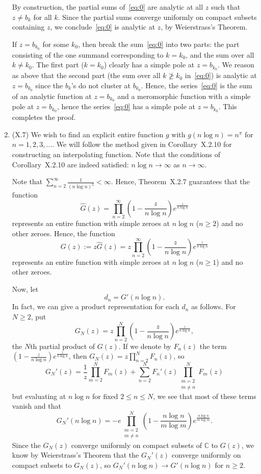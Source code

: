 \documentclass[11pt]{book}
\theoremstyle{definition}
\begin{document}
\begin{enumerate}
    By construction, the partial sums of~\eqref{eq:0} are analytic at all $z$ such that $z\neq b_k$ for all $k$. Since the partial sums converge uniformly on compact subsets containing $z$, we conclude~\eqref{eq:0} is analytic at $z$, by Weierstrass's Theorem. 
    
    If $z=b_{k_0}$ for some $k_0$, then break the sum~\eqref{eq:0} into two parts: the part consisting of the one summand corresponding to $k=k_0$, and the sum over all $k\neq k_0$.  The first part ($k=k_0$) clearly has a simple pole at $z=b_{k_0}$.  We reason as above that the second part (the sum over all $k\ngeq k_0$ in~\eqref{eq:0}) is analytic at $z=b_{k_0}$ since the $b_k$'s do not cluster at $b_{k_0}$.  Hence, the series~\eqref{eq:0} is the sum of an analytic function at $z=b_{k_0}$ and a meromorphic function with a simple pole at $z=b_{k_0}$, hence the series~\eqref{eq:0} has a simple pole at $z=b_{k_0}$.   This completes the proof. 
    
  \item (X.7)  We wish to find an explicit entire function $g$ with $g(n\log n) = n^\pi$ for $n=1,2,3,\ldots$.  We will follow the method given in Corollary~X.2.10 for constructing an interpolating function.  Note that the conditions of Corollary~X.2.10 are indeed satisfied: $n\log n\to \infty$ as $n \to \infty$.  

    Note that $\sum_{n=2}^\infty \frac{1}{(n\log n)^2} < \infty$.  Hence, Theorem~X.2.7 guarantees that the function 
    \[ \widehat G(z) =  \prod_{n=2}^\infty \left( 1 - \frac{z}{n\log n} \right) e^{\tfrac{z}{n\log n}}  \]  represents an entire function with simple zeroes at $n\log n$ ($n\geq 2$) and no other zeroes.  Hence, the function 
    \[ G(z) :=  z \widehat G(z) = z \prod_{n=2}^\infty \left( 1 - \frac{z}{n\log n} \right) e^{\tfrac{z}{n\log n}}  \] represents an entire function with simple zeroes at $n\log n$ ($n\geq 1$) and no other zeroes. 

    Now, let 
    \[ d_n = G'(n\log n).  \] In fact, we can give a product representation for each $d_n$ as follows.  For $N\geq 2$, put \[ G_N(z) = z \prod_{n=2}^N \left( 1 - \frac{z}{n\log n} \right) e^{\tfrac{z}{n\log n}}, \]  the $N$th partial product of $G(z)$.  If we denote by $F_n(z)$ the term $\left( 1- \frac{z}{n\log n} \right) e^{\frac{z}{n\log n}}$, then $G_N(z) = z \prod_{n=2}^N F_n(z)$, so 
    \[ G_N'(z) = \frac{1}{z}\prod_{m=2}^N F_m(z) + \sum_{n=2}^N F_n'(z) \prod_{\substack{m=2\\ m\neq n}}^N F_m(z)\] 
    but evaluating at $n\log n$ for fixed $2\leq n\leq N$, we see that most of these terms vanish and that 
    \[ G_N'(n\log n) = -e \prod_{\substack{m=2\\ m\neq n}}^N \left( 1 - \frac{n\log n}{m\log m} \right) e^{\tfrac{n\log n}{m\log m}} .\]  Since the $G_N(z)$ converge uniformly on compact subsets of $\mathbb C$ to $G(z)$, we know by Weierstrass's Theorem that the $G_N'(z)$ converge uniformly on compact subsets to $G_N(z)$, so $G_N'(n\log n) \to G'(n\log n)$ for $n\geq 2$. 


\end{enumerate}
\end{document}
